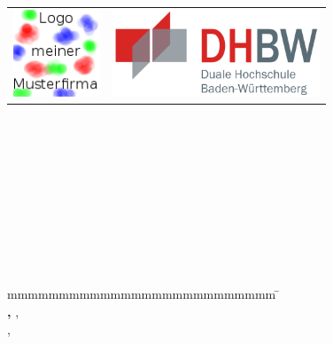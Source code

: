
\begin{titlepage}
	\begin{longtable}{p{} p{}}
	  {\includegraphics[height=2.6cm]{images/logo.png}} & 
	  {\includegraphics[height=2.6cm]{images/dhbw.png}}
	\end{longtable}
	\enlargethispage{20mm}
	\begin{center}
	  \vspace*{12mm}	{\LARGE\bf \titel }\\
	  \vspace*{12mm}	{\large\bf \arbeit}\\
	  \vspace*{12mm}	\langdeckblattabschlusshinleitung\\
	  \vspace*{3mm} 	{\bf \abschluss}\\
    \vspace*{12mm}	\langartikelstudiengang{} \studiengang\\
    \vspace*{3mm} 	\langanderdh{} \dhbw\\
	  \vspace*{12mm}	\langvon\\
	  \vspace*{3mm} 	{\large\bf \autor}\\
	  \vspace*{12mm}	\datumAbgabe\\
	\end{center}
	\vfill
	\begin{spacing}{1.2}
	\begin{tabbing}
		mmmmmmmmmmmmmmmmmmmmmmmmmm             \= \kill
		\textbf{\langdbbearbeitungszeit}       \>  \zeitraum\\
		\textbf{\langdbmatriknr, \langdbkurs}  \>  \martrikelnr, \kurs\\
		\textbf{\langdbfirma}                  \>  \firma, \firmenort\\
		\textbf{\langdbbetreuer}               \>  \betreuer\\
		\textbf{\langdbgutachter}              \>  \gutachter
	\end{tabbing}
	\end{spacing}
\end{titlepage}
